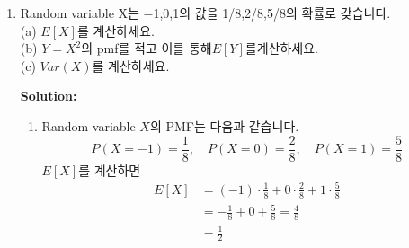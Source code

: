 \documentclass{article}
\newenvironment{solution}
{
    \par\medskip
    \noindent\textbf{Solution:}
    \begin{adjustwidth}{1em}{0em}
}
{
    \end{adjustwidth}
    \medskip
}
\begin{document}
\begin{enumerate}[label=\textbf{\arabic*.}, leftmargin=*]
\begin{solution}
\begin{enumerate}[label=(\alph*), leftmargin=2em, itemsep=1em]
            \item$X=$ “짝수를 굴립니다”, $Y=$ “소수를 굴립니다”  의 outcome을 정리 하면 아래와 같습니다.
            \begin{align*}
                X&=\{2,4,6,8,10,12,14,16,18,20\}\\
                Y&=\{2,3,5,7,11,13,17,19\} \\
                X\cap Y&=\{2\}
            \end{align*}
                          
            각 확률은  
            \begin{align*}
                P(X)=\frac{10}{20}=\frac12\\  
                P(Y)=\frac{8}{20}=\frac25  \\  
                P(X\cap Y)=\frac{1}{20}  
            \end{align*}
            그리고  
            $$  
            P(X)P(Y)=\frac{10}{20}\cdot\frac{8}{20}=\frac15  
            $$  
            하지만  
            $$  
            \frac1{20}\ne\frac15 
            $$
            $P(X\cap Y)\ne P(X)P(Y)$ 이므로 두 사건은 독립이 아닙니다.
            
        \end{enumerate}
    \end{solution}
\newpage

\item Random variable X는 −1,0,1의 값을 1/8,2/8,5/8의 확률로 갖습니다.\\
(a) $E[X]$를 계산하세요.\\
(b) $Y =X^2$의 pmf를 적고 이를 통해$E[Y]$를계산하세요.\\
(c) $Var(X)$를 계산하세요.

    \begin{solution}
        \begin{enumerate}[label=(\alph*), leftmargin=2em, itemsep=1em]
            
            \item Random variable $X$의 PMF는 다음과 같습니다.  
            $$  
            P(X=-1)=\frac18,\quad P(X=0)=\frac28,\quad P(X=1)=\frac58  
            $$  
            $E[X]$를 계산하면  
            \begin{align*}
                E[X]&=(-1)\cdot\frac18+0\cdot\frac28+1\cdot\frac58\\  
                &=-\frac18+0+\frac58=\frac48\\
                &=\frac12  
            \end{align*}
              

\end{enumerate}
\end{solution}
\end{enumerate}
\end{document}
